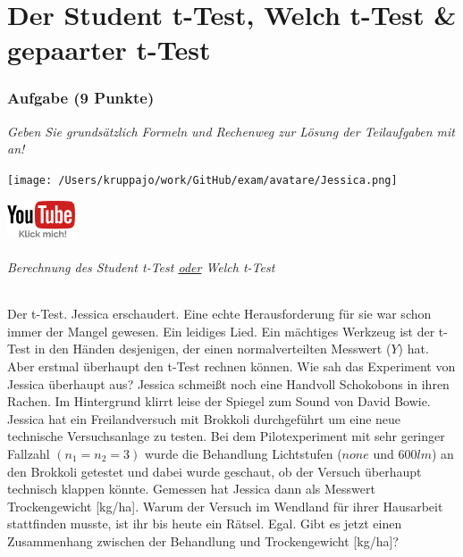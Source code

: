 \documentclass[a4paper, 9pt]{scrartcl}\usepackage[]{graphicx}\usepackage[]{xcolor}
\begin{document}
\part{Der Student t-Test, Welch t-Test \& gepaarter t-Test}

\section{Aufgabe \hfill (9 Punkte)}

\textit{Geben Sie grundsätzlich Formeln und Rechenweg zur Lösung der Teilaufgaben mit an!} \\[1Ex]
 

 
\begin{minipage}[t]{0.5\textwidth}
\texttt{[image: /Users/kruppajo/work/GitHub/exam/avatare/Jessica.png]}
\end{minipage}
\begin{minipage}[t]{0.5\textwidth}
\hfill
\href{https://youtu.be/eejS2uG4o-M}{\includegraphics[width = 2cm]{img/youtube}}
\end{minipage}
\vspace{-3ex}



\paragraph{Berechnung des Student t-Test \underline{oder} Welch t-Test}

Der t-Test. Jessica erschaudert. Eine echte Herausforderung für sie war schon immer der Mangel gewesen. Ein leidiges Lied. Ein mächtiges Werkzeug ist der t-Test in den Händen desjenigen, der einen normalverteilten Messwert ($Y$) hat. Aber erstmal überhaupt den t-Test rechnen können. Wie sah das Experiment von Jessica überhaupt aus? Jessica schmeißt noch eine Handvoll Schokobons in ihren Rachen. Im Hintergrund klirrt leise der Spiegel zum Sound von David Bowie. Jessica hat ein Freilandversuch mit Brokkoli durchgeführt um eine neue technische Versuchsanlage zu testen. Bei dem Pilotexperiment mit sehr geringer Fallzahl $(n_1 = n_2 = 3)$ wurde die Behandlung Lichtstufen ($none$ und $600lm$) an den Brokkoli getestet und dabei wurde geschaut, ob der Versuch überhaupt technisch klappen könnte. Gemessen hat Jessica dann als Messwert Trockengewicht [kg/ha]. Warum der Versuch im Wendland für ihrer Hausarbeit stattfinden musste, ist ihr bis heute ein Rätsel. Egal. Gibt es jetzt einen Zusammenhang zwischen der Behandlung und Trockengewicht [kg/ha]?
\end{document}
